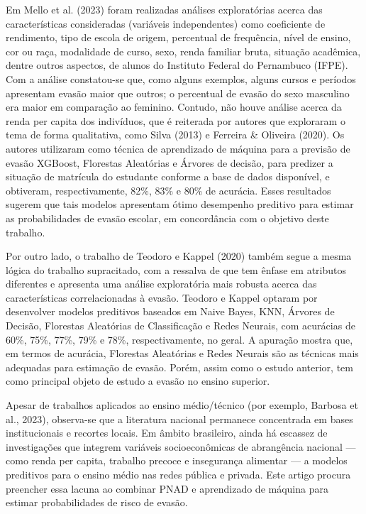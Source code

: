\documentclass[english, spanish, brazilian]{RBIEarticle} %
\begin{document}
Em Mello et al. (2023) foram realizadas análises exploratórias acerca das características
consideradas (variáveis independentes) como coeficiente de rendimento, tipo de escola de origem,
percentual de frequência, nível de ensino, cor ou raça, modalidade de curso, sexo, renda familiar
bruta, situação acadêmica, dentre outros aspectos, de alunos do Instituto Federal do Pernambuco
(IFPE). Com a análise constatou-se que, como alguns exemplos, alguns cursos e períodos apresentam
evasão maior que outros; o percentual de evasão do sexo masculino era maior em comparação ao
feminino. Contudo, não houve análise acerca da renda per capita dos indivíduos, que é reiterada
por autores que exploraram o tema de forma qualitativa, como Silva (2013) e Ferreira \& Oliveira
(2020). Os autores utilizaram como técnica de aprendizado de máquina para a previsão de evasão
XGBoost, Florestas Aleatórias e Árvores de decisão, para predizer a situação de matrícula do
estudante conforme a base de dados disponível, e obtiveram, respectivamente, 82\%, 83\% e 80\%
de acurácia. Esses resultados sugerem que tais modelos apresentam ótimo desempenho preditivo
para estimar as probabilidades de evasão escolar, em concordância com o objetivo deste trabalho.

Por outro lado, o trabalho de Teodoro e Kappel (2020) também segue a mesma lógica do
trabalho supracitado, com a ressalva de que tem ênfase em atributos diferentes e apresenta uma
análise exploratória mais robusta acerca das características correlacionadas à evasão. Teodoro e
Kappel optaram por desenvolver modelos preditivos baseados em Naive Bayes, KNN, Árvores de
Decisão, Florestas Aleatórias de Classificação e Redes Neurais, com acurácias de 60\%, 75\%,
77\%, 79\% e 78\%, respectivamente, no geral. A apuração mostra que, em termos de acurácia,
Florestas Aleatórias e Redes Neurais são as técnicas mais adequadas para estimação de evasão.
Porém, assim como o estudo anterior, tem como principal objeto de estudo a evasão no ensino
superior.

Apesar de trabalhos aplicados ao ensino médio/técnico (por exemplo, Barbosa et al., 2023),
observa-se que a literatura nacional permanece concentrada em bases institucionais e recortes
locais. Em âmbito brasileiro, ainda há escassez de investigações que integrem variáveis
socioeconômicas de abrangência nacional — como renda per capita, trabalho precoce e insegurança
alimentar — a modelos preditivos para o ensino médio nas redes pública e privada. Este artigo
procura preencher essa lacuna ao combinar PNAD e aprendizado de máquina para estimar
probabilidades de risco de evasão.
\end{document}
